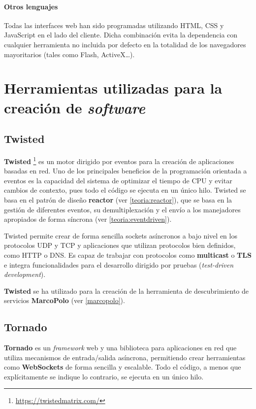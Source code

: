 \paragraph{Otros lenguajes\\}

Todas las interfaces web han sido programadas utilizando HTML, CSS y JavaScript en el lado del cliente. Dicha combinación evita la dependencia con cualquier herramienta no incluida por defecto en la totalidad de los navegadores mayoritarios (tales como Flash, ActiveX\dots).

\section{Herramientas utilizadas para la creación de \textit{software}}

\subsection{Twisted}

\textbf{Twisted} \footnote{\href{https://twistedmatrix.com/}{https://twistedmatrix.com/}} es un motor dirigido por eventos para la creación de aplicaciones basadas en red. Uno de los principales beneficios de la programación orientada a eventos es la capacidad del sistema de optimizar el tiempo de CPU y evitar cambios de contexto, pues todo el código se ejecuta en un único hilo. Twisted se basa en el patrón de diseño \textbf{reactor} (ver \ref{teoria:reactor}), que se basa en la gestión de diferentes eventos, su demultiplexación y el envío a los manejadores apropiados de forma síncrona (ver \ref{teoria:eventdriven}).

Twisted permite crear de forma sencilla sockets asíncronos a bajo nivel en los protocolos UDP y TCP y aplicaciones que utilizan protocolos bien definidos, como HTTP o DNS. Es capaz de trabajar con protocolos como \textbf{multicast} o \textbf{TLS} e integra funcionalidades para el desarrollo dirigido por pruebas (\textit{test-driven development}).

\textbf{Twisted} se ha utilizado para la creación de la herramienta de descubrimiento de servicios \textbf{MarcoPolo} (ver \ref{marcopolo}).

\subsection{Tornado}

\textbf{Tornado} es un \textit{framework} web y una biblioteca para aplicaciones en red que utiliza mecanismos de entrada/salida asíncrona, permitiendo crear herramientas como \textbf{WebSockets} de forma sencilla y escalable. Todo el código, a menos que explícitamente se indique lo contrario, se ejecuta en un único hilo.

